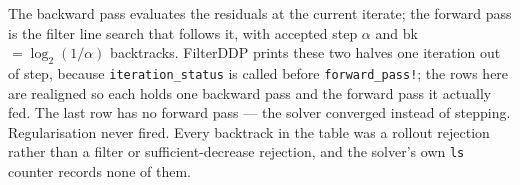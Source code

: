 \begin{table}[!t]
\centering
\caption{FilterDDP Iterations, All Bounds}
\label{tab:convergence}
\setlength{\tabcolsep}{4pt}
\footnotesize


\smallskip

\raggedright
\footnotesize The backward pass evaluates the residuals at the current iterate;
the forward pass is the filter line search that follows it, with accepted step
$\alpha$ and bk $= \log_2(1/\alpha)$ backtracks.  FilterDDP prints these two
halves one iteration out of step, because \texttt{iteration\_status} is called
before \texttt{forward\_pass!}; the rows here are realigned so each holds one
backward pass and the forward pass it actually fed.  The last row has no forward
pass --- the solver converged instead of stepping.  Regularisation never fired.
Every backtrack in the table was a rollout rejection rather than a filter or
sufficient-decrease rejection, and the solver's own \texttt{ls} counter records
none of them.
\end{table}
